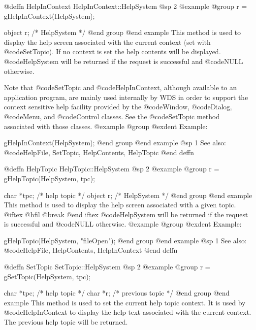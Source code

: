 @deffn {HelpInContext} HelpInContext::HelpSystem
@sp 2
@example
@group
r = gHelpInContext(HelpSystem);

object  r;      /*  HelpSystem  */
@end group
@end example
This method is used to display the help screen associated with the
current context (set with @code{SetTopic}).  If no context is set the
help contents will be displayed.  @code{HelpSystem} will be returned if
the request is successful and @code{NULL} otherwise.

Note that @code{SetTopic} and @code{HelpInContext}, although available
to an application program, are mainly used internally by WDS in order to
support the context sensitive help facility provided by the @code{Window},
@code{Dialog}, @code{Menu}, and @code{Control} classes.  See the
@code{SetTopic} method associated with those classes.
@example
@group
@exdent Example:

gHelpInContext(HelpSystem);
@end group
@end example
@sp 1
See also:  @code{HelpFile, SetTopic, HelpContents, HelpTopic}
@end deffn







@deffn {HelpTopic} HelpTopic::HelpSystem
@sp 2
@example
@group
r = gHelpTopic(HelpSystem, tpc);

char    *tpc;   /*  help topic  */
object  r;      /*  HelpSystem  */
@end group
@end example
This method is used to display the help screen associated with a given topic.
@iftex
@hfil @break 
@end iftex
@code{HelpSystem} will be returned if the request is successful
and @code{NULL} otherwise.
@example
@group
@exdent Example:

gHelpTopic(HelpSystem, "fileOpen");
@end group
@end example
@sp 1
See also:  @code{HelpFile, HelpContents, HelpInContext}
@end deffn














@deffn {SetTopic} SetTopic::HelpSystem
@sp 2
@example
@group
r = gSetTopic(HelpSystem, tpc);

char    *tpc;   /*  help topic      */
char    *r;     /*  previous topic  */
@end group
@end example
This method is used to set the current help topic context.  It is
used by @code{HelpInContext} to display the help text associated
with the current context.  The previous help topic will be returned.

